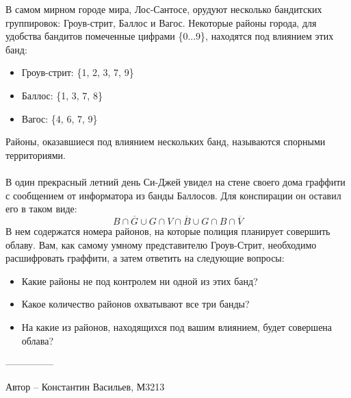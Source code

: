 \question
В самом мирном городе мира, Лос-Сантосе, орудуют несколько бандитских группировок: Гроув-стрит, Баллос и Вагос. Некоторые районы города, для удобства бандитов помеченные цифрами \{0...9\}, находятся под влиянием этих банд:
\begin{itemize}
    \item Гроув-стрит: \{1, 2, 3, 7, 9\}
    \item Баллос: \{1, 3, 7, 8\}
    \item Вагос: \{4, 6, 7, 9\}
\end{itemize}
Районы, оказавшиеся под влиянием нескольких банд, называются спорными территориями.
\\
\\
В один прекрасный летний день Си-Джей увидел на стене своего дома граффити с сообщением от информатора из банды Баллосов. Для конспирации он оставил его в таком виде:
\begin{equation*}
B \cap \overline{G} \cup G \cap V \cap \overline{B} \cup G \cap B \cap \overline{V}
\end{equation*}
В нем содержатся номера районов, на которые полиция планирует совершить облаву. Вам, как самому умному представителю Гроув-Стрит, необходимо расшифровать граффити, а затем ответить на следующие вопросы:

\begin{itemize}
    \item Какие районы не под контролем ни одной из этих банд?
    \item Какое количество районов охватывают все три банды?
    \item На какие из районов, находящихся под вашим влиянием, будет совершена облава?
\end{itemize}

---------------

Автор -- Константин Васильев, М3213